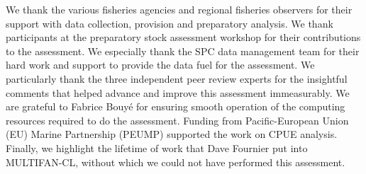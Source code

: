 We thank the various fisheries agencies and regional fisheries observers for their support with data collection, provision and preparatory analysis. We thank participants at the preparatory stock assessment workshop for their contributions to the assessment. We especially thank the SPC data management team for their hard work and support to provide the data fuel for the assessment. We particularly thank the three independent peer review experts for the insightful comments that helped advance and improve this assessment immeasurably. We are grateful to Fabrice Bouyé for ensuring smooth operation of the computing resources required to do the assessment. Funding from Pacific-European Union (EU) Marine Partnership (PEUMP) supported the work on CPUE analysis. Finally, we highlight the lifetime of work that Dave Fournier put into MULTIFAN-CL, without which we could not have performed this assessment.

\newpage
